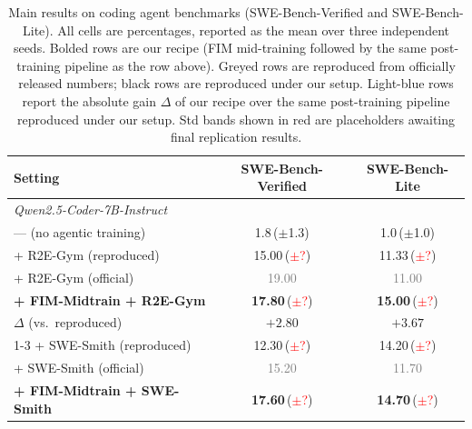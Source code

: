 \begin{table}[t]
\centering
\caption{Main results on coding agent benchmarks (SWE-Bench-Verified and
SWE-Bench-Lite). All cells are percentages, reported as the mean over
three independent seeds. Bolded rows are our recipe (FIM mid-training
followed by the same post-training pipeline as the row above). Greyed
rows are reproduced from officially released numbers; black rows are
reproduced under our setup. \textcolor{blue!70!black}{Light-blue rows
report the absolute gain $\Delta$ of our recipe over the same
post-training pipeline reproduced under our setup.} Std bands shown in
red are placeholders awaiting final replication results.}
\label{tab:main}
\small
\setlength{\tabcolsep}{6pt}
\begin{tabular}{lcc}
\toprule
Setting & SWE-Bench-Verified & SWE-Bench-Lite \\
\midrule
\multicolumn{3}{l}{\textit{Qwen2.5-Coder-7B-Instruct}} \\
\quad --- (no agentic training)              & 1.8\,($\pm$1.3)                              & 1.0\,($\pm$1.0) \\
\quad + R2E-Gym (reproduced)                 & 15.00\,(\textcolor{red}{$\pm$?})              & 11.33\,(\textcolor{red}{$\pm$?}) \\
\quad + R2E-Gym (official)                   & \textcolor{gray}{19.00}                        & \textcolor{gray}{11.00} \\
\quad \textbf{+ FIM-Midtrain + R2E-Gym}      & \textbf{17.80}\,(\textcolor{red}{$\pm$?})     & \textbf{15.00}\,(\textcolor{red}{$\pm$?}) \\
\rowcolor{blue!8}
\quad\quad $\Delta$ (vs.\ reproduced)        & $+2.80$                                        & $+3.67$ \\
\cmidrule(lr){1-3}
\quad + SWE-Smith (reproduced)               & 12.30\,(\textcolor{red}{$\pm$?})              & 14.20\,(\textcolor{red}{$\pm$?}) \\
\quad + SWE-Smith (official)                 & \textcolor{gray}{15.20}                        & \textcolor{gray}{11.70} \\
\quad \textbf{+ FIM-Midtrain + SWE-Smith}    & \textbf{17.60}\,(\textcolor{red}{$\pm$?})     & \textbf{14.70}\,(\textcolor{red}{$\pm$?}) \\

\end{tabular}
\end{table}
